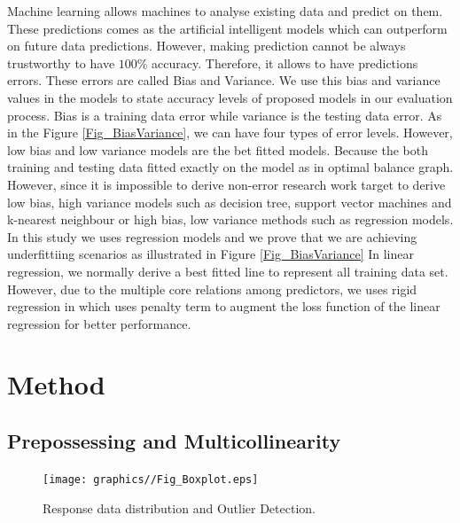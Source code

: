 Machine learning allows machines to analyse existing data and 
predict on them. These predictions comes as the 
artificial intelligent models which can outperform on future data predictions. 
However, making prediction cannot be always trustworthy 
to have $100\%$ accuracy. 
Therefore, it allows to have predictions errors. 
These errors are called Bias and Variance.
We use this bias and variance values in the models to state 
accuracy levels of proposed models in our evaluation process.
Bias is a training data error while variance is the testing data error.
As in the Figure \cref{Fig_BiasVariance}, we can have four types of error levels.
However, low bias and low variance models are the bet fitted models.
Because the both training and testing data fitted exactly on
the model as in optimal balance graph.
However, since it is impossible to derive non-error research
work target to derive low bias, high variance models such as
decision tree, support vector machines and k-nearest neighbour or high bias, low variance methods such as regression models.
In this study we uses regression models and we prove that
we are achieving underfittiing scenarios as illustrated in Figure \cref{Fig_BiasVariance}
In linear regression, we normally derive a best fitted line to represent all training data set.
However, due to the multiple core relations among predictors, we uses rigid regression in which uses penalty term to 
augment the loss function of the linear regression for better performance.

\gliMarker  %

\section{Method} \label{sec-method}

\subsection{Prepossessing and Multicollinearity}

\begin{figure}
  \texttt{[image: graphics//Fig\_Boxplot.eps]}
  \caption{Response data distribution and Outlier Detection.} \label{Bias}
\end{figure}

